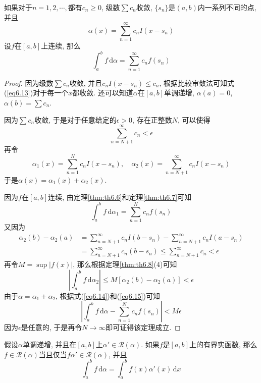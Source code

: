 \documentclass[cn,12pt,math=mtpro2,citestyle=gb7714-2015,bibstyle=gb7714-2015,twocol]{elegantbook}
\newcommand{\dx}{\,\text{d}x}
\newcommand{\da}{\,\text{d}\alpha}
\begin{document}
\begin{theorem}
  如果对于$n=1,2,\cdots,$都有$c_n\geq0$, 级数$\sum c_n$收敛, $\{s_n\}$是$(a,b)$内一系列不同的点, 并且
  \begin{equation}\label{eq6.13}
    \alpha(x)=\sum_{n=1}^{\infty}c_nI(x-s_n)
  \end{equation}
  设$f$在$[a,b]$上连续, 那么
  $$\int_{a}^{b}f\da=\sum_{n=1}^{\infty}c_nf(s_n)$$
\end{theorem}
\begin{proof}
  因为级数$\sum c_n$收敛, 并且$c_nI(x-s_n)\leq c_n$, 根据比较审敛法可知式(\ref{eq6.13})对于每一个$x$都收敛. 还可以知道$\alpha$在$[a,b]$单调递增, $\alpha(a)=0$, $\alpha(b)=\sum c_n$.

  因为$\sum c_n$收敛, 于是对于任意给定的$\epsilon>0$, 存在正整数$N$, 可以使得
  $$\sum_{n=N+1}^{\infty}c_n<\epsilon$$
  再令
  $$\alpha_1(x)=\sum_{n=1}^{N}c_nI(x-s_n),\quad\alpha_2(x)=\sum_{n=N+1}^{\infty}c_nI(x-s_n)$$
  于是$\alpha(x)=\alpha_1(x)+\alpha_2(x)$.

因为$f$在$[a,b]$连续, 由定理\ref{thm:th6.6}和定理\ref{thm:th6.7}可知
  \begin{equation}\label{eq6.14}
 \int_a^bf\da_1=\sum_{n=1}^Nc_nf(s_n)
\end{equation}
  又因为
 \begin{align*}
 \alpha_2(b)-\alpha_2(a)&=\sum_{n=N+1}^\infty c_nI(b-s_n)-\sum_{n=N+1}^\infty c_nI(a-s_n) \\
&=\sum_{n=N+1}^\infty c_n(b-s_n)\leq\sum_{n=N+1}^\infty c_n<\epsilon
\end{align*}
再令$M=\sup |f(x)|$, 那么根据定理\ref{thm:th6.8}(4)可知
  \begin{equation}\label{eq6.15}
 \left|\int_a^bf\da_2\right|\leq M[\alpha_2(b)-\alpha_2(a)]<\epsilon
\end{equation}
由于$\alpha=\alpha_1+\alpha_2$, 根据式(\ref{eq6.14})和(\ref{eq6.15})可知
$$\left|\int_a^bf\da-\sum_{n=1}^Nc_nf(s_n)\right|<M\epsilon$$
因为$\epsilon$是任意的, 于是再令$N\rightarrow\infty$即可证得该定理成立.

\end{proof}
\begin{theorem}\label{thm:th6.11}
假设$\alpha$单调递增, 并且在$[a,b]$上$\alpha'\in\mathscr{R}(\alpha)$. 如果$f$是$[a,b]$上的有界实函数, 那么$f\in\mathscr{R}(\alpha)$当且仅当$f\alpha'\in\mathscr{R}(\alpha)$, 并且
$$\int_a^bf\da=\int_a^bf(x)\alpha'(x)\dx$$
\end{theorem}
\end{document}
